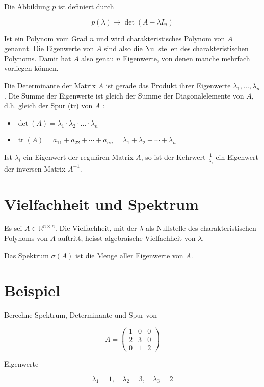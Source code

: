 \documentclass[10pt]{article}
\begin{document}
Die Abbildung $p$ ist definiert durch

$$
p(\lambda) \rightarrow \operatorname{det}\left(A-\lambda I_{n}\right)
$$

Ist ein Polynom vom Grad $n$ und wird charakteristisches Polynom von $A$ genannt. Die Eigenwerte von $A$ sind also die Nullstellen des charakteristischen Polynoms. Damit hat $A$ also genau $n$ Eigenwerte, von denen manche mehrfach vorliegen können.

Die Determinante der Matrix $A$ ist gerade das Produkt ihrer Eigenwerte $\lambda_{1}, \ldots, \lambda_{n}$. Die Summe der Eigenwerte ist gleich der Summe der Diagonalelemente von $A$, d.h. gleich der Spur (tr) von $A$ :

\begin{itemize}
  \item $\operatorname{det}(A)=\lambda_{1} \cdot \lambda_{2} \cdot \ldots \cdot \lambda_{n}$
  \item $\operatorname{tr}(A)=a_{11}+a_{22}+\cdots+a_{n n}=\lambda_{1}+\lambda_{2}+\cdots+\lambda_{n}$
\end{itemize}

Ist $\lambda_{i}$ ein Eigenwert der regulären Matrix $A$, so ist der Kehrwert $\frac{1}{\lambda_{i}}$ ein Eigenwert der inversen Matrix $A^{-1}$.

\section*{Vielfachheit und Spektrum}
Es sei $A \in \mathbb{R}^{n \times n}$. Die Vielfachheit, mit der $\lambda$ als Nullstelle des charakteristischen Polynoms von $A$ auftritt, heisst algebraische Vielfachheit von $\lambda$.

Das Spektrum $\sigma(A)$ ist die Menge aller Eigenwerte von $A$.

\section*{Beispiel}
Berechne Spektrum, Determinante und Spur von

$$
A=\left(\begin{array}{lll}
1 & 0 & 0 \\
2 & 3 & 0 \\
0 & 1 & 2
\end{array}\right)
$$

Eigenwerte

$$
\lambda_{1}=1, \quad \lambda_{2}=3, \quad \lambda_{3}=2
$$
\end{document}
